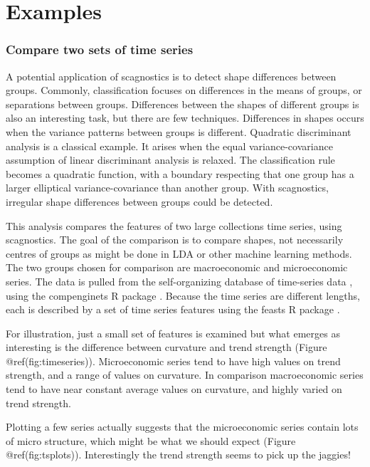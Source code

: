 \hypertarget{examples}{%
\section{Examples}\label{examples}}

\hypertarget{compare-two-sets-of-time-series}{%
\subsubsection{Compare two sets of time
series}\label{compare-two-sets-of-time-series}}

A potential application of scagnostics is to detect shape differences
between groups. Commonly, classification focuses on differences in the
means of groups, or separations between groups. Differences between the
shapes of different groups is also an interesting task, but there are
few techniques. Differences in shapes occurs when the variance patterns
between groups is different. Quadratic discriminant analysis is a
classical example. It arises when the equal variance-covariance
assumption of linear discriminant analysis is relaxed. The
classification rule becomes a quadratic function, with a boundary
respecting that one group has a larger elliptical variance-covariance
than another group. With scagnostics, irregular shape differences
between groups could be detected.

This analysis compares the features of two large collections time
series, using scagnostics. The goal of the comparison is to compare
shapes, not necessarily centres of groups as might be done in LDA or
other machine learning methods. The two groups chosen for comparison are
macroeconomic and microeconomic series. The data is pulled from the
self-organizing database of time-series data \citep{sots}, using the
compenginets R package \citep{compenginets}. Because the time series are
different lengths, each is described by a set of time series features
\citep[chapter 4 of][]{fpp} using the feasts R package \citep{feasts}.

For illustration, just a small set of features is examined but what
emerges as interesting is the difference between curvature and trend
strength (Figure @ref(fig:timeseries)). Microeconomic series tend to
have high values on trend strength, and a range of values on curvature.
In comparison macroeconomic series tend to have near constant average
values on curvature, and highly varied on trend strength.

Plotting a few series actually suggests that the microeconomic series
contain lots of micro structure, which might be what we should expect
(Figure @ref(fig:tsplots)). Interestingly the trend strength seems to
pick up the jaggies!

